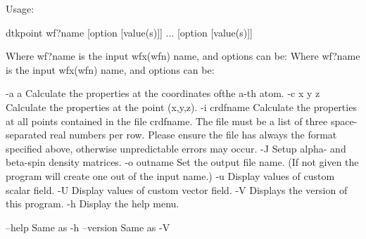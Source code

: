 

Usage:

	dtkpoint wf?name [option [value(s)]] ... [option [value(s)]]

Where wf?name is the input wfx(wfn) name, and options can be:
Where wf?name is the input wfx(wfn) name, and options can be:

  -a a      	Calculate the properties at the coordinates ofthe a-th atom.
  -c x y z  	Calculate the properties at the point (x,y,z).
  -i crdfname	Calculate the properties at all points contained
            	  in the file crdfname. The file must be a list of three 
            	  space-separated real numbers per row.
            	  Please ensure the file has always the format specified above,
            	  otherwise unpredictable errors may occur.
  -J        	Setup alpha- and beta-spin density matrices.
  -o outname	Set the output file name.
            	  (If not given the program will create one out of
            	  the input name.)
  -u     	Display values of custom scalar field.
  -U     	Display values of custom vector field.
  -V     	Displays the version of this program.
  -h     	Display the help menu.

  --help    		Same as -h
  --version 		Same as -V
